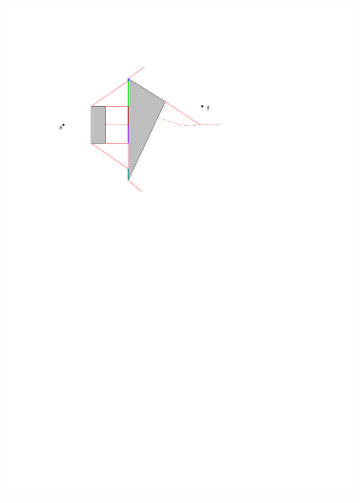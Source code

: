 \begin{figure}[H]
\centering
\begin{subfigure}{.5\textwidth}
  \centering
  \includegraphics[width=.95\linewidth]{figures/spm0projection.pdf}
  \caption{}
  \label{fig:spm0projection}
\end{subfigure}%
\begin{subfigure}{.5\textwidth}
  \centering

\end{subfigure}
\end{figure}
